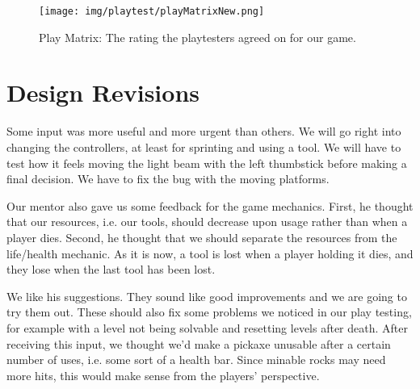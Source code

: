 \begin{figure}[h!]
    \centering
    \texttt{[image: img/playtest/playMatrixNew.png]}
    \caption{Play Matrix: The rating the playtesters agreed on for our game.}
    \label{fig:my_label}
\end{figure}


\section{Design Revisions}

Some input was more useful and more urgent than others. We will go right into changing the controllers, at least for sprinting and using a tool. We will have to test how it feels moving the light beam with the left thumbstick before making a final decision. We have to fix the bug with the moving platforms.

Our mentor also gave us some feedback for the game mechanics. First, he thought that our resources, i.e. our tools, should decrease upon usage rather than when a player dies. Second, he thought that we should separate the resources from the life/health mechanic. As it is now, a tool is lost when a player holding it dies, and they lose when the last tool has been lost.

We like his suggestions. They sound like good improvements and we are going to try them out. These should also fix some problems we noticed in our play testing, for example with a level not being solvable and resetting levels after death. After receiving this input, we thought we'd make a pickaxe unusable after a certain number of uses, i.e. some sort of a health bar. Since minable rocks may need more hits, this would make sense from the players' perspective.
